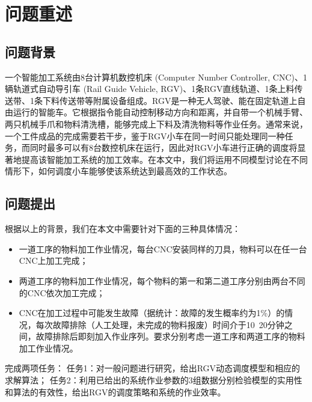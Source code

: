 \documentclass{cumcmthesis}
\begin{document}
	
	\begin{abstract}
	
	\end{abstract}
	
	\tableofcontents
	
	\section{问题重述}
	\subsection{问题背景}
	一个智能加工系统由8台计算机数控机床 (Computer Number Controller, CNC)、1辆轨道式自动导引车 (Rail Guide Vehicle, RGV)、1条RGV直线轨道、1条上料传送带、1条下料传送带等附属设备组成。RGV是一种无人驾驶、能在固定轨道上自由运行的智能车。它根据指令能自动控制移动方向和距离，并自带一个机械手臂、两只机械手爪和物料清洗槽，能够完成上下料及清洗物料等作业任务。\cite{Saiti}通常来说，一个工件成品的完成需要若干步，鉴于RGV小车在同一时间只能处理同一种任务，而同时最多可以有8台数控机床在运行，因此对RGV小车进行正确的调度将显著地提高该智能加工系统的加工效率。在本文中，我们将运用不同模型讨论在不同情形下，如何调度小车能够使该系统达到最高效的工作状态。
	
	\subsection{问题提出}
	根据以上的背景，我们在本文中需要针对下面的三种具体情况：
	
	\begin{itemize}
		\item 一道工序的物料加工作业情况，每台CNC安装同样的刀具，物料可以在任一台CNC上加工完成；
		\item 两道工序的物料加工作业情况，每个物料的第一和第二道工序分别由两台不同的CNC依次加工完成；
		\item CNC在加工过程中可能发生故障（据统计：故障的发生概率约为1\%）的情况，每次故障排除（人工处理，未完成的物料报废）时间介于10~20分钟之间，故障排除后即刻加入作业序列。要求分别考虑一道工序和两道工序的物料加工作业情况。
	\end{itemize}
	
	完成两项任务：\newline
	任务1：对一般问题进行研究，给出RGV动态调度模型和相应的求解算法；\newline
	任务2：利用已给出的系统作业参数的3组数据分别检验模型的实用性和算法的有效性，给出RGV的调度策略和系统的作业效率。
	
\end{document}
